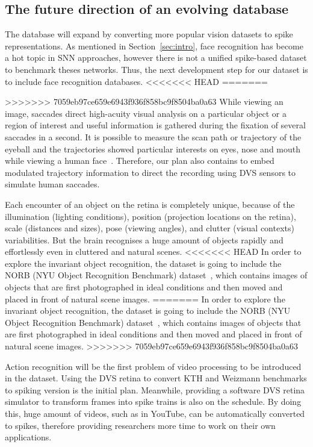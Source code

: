 \subsection{The future direction of an evolving database}
The database will expand by converting more popular vision datasets to spike representations.
As mentioned in Section~\ref{sec:intro}, face recognition has become a hot topic in SNN approaches, however there is not a unified spike-based dataset to benchmark theses networks.
Thus, the next development step for our dataset is to include face recognition databases.
<<<<<<< HEAD
=======

>>>>>>> 7059eb97ce659e6943f936f858bc9f8504ba0a63
While viewing an image,  saccades direct high-acuity visual analysis on a particular object or a region of interest and useful information is gathered during the fixation of several saccades in a second.
It is possible to measure the scan path or trajectory of the eyeball and the trajectories showed particular interests on eyes, nose and mouth while viewing a human face~\citep{yarbus1967eye}.
Therefore, our plan also contains to embed modulated trajectory information to direct the recording using DVS sensors to simulate human saccades.


Each encounter of an object on the retina is completely unique, because of the illumination (lighting conditions), position (projection locations on the retina), scale (distances and sizes), pose (viewing angles), and clutter (visual contexts) variabilities.
But the brain recognises a huge amount of objects rapidly and effortlessly even in cluttered and natural scenes.
<<<<<<< HEAD
In order to explore the invariant object recognition, the dataset is going to include the NORB (NYU Object Recognition Benchmark) dataset~\citep{lecun2004learning}, which contains images of objects that are first photographed in ideal conditions and then moved and placed in front of natural scene images.
=======
In order to explore the invariant object recognition, the dataset is going to include the NORB (NYU Object Recognition Benchmark) dataset~\citep{lecun2004learning}, which contains images of objects that are first photographed in ideal conditions and then moved and placed in front of natural scene images. 
>>>>>>> 7059eb97ce659e6943f936f858bc9f8504ba0a63

Action recognition will be the first problem of video processing to be introduced in the dataset.
Using the DVS retina to convert KTH and Weizmann benchmarks to spiking version is the initial plan.
Meanwhile, providing a software DVS retina simulator to transform  frames into spike trains is also on the schedule.
By doing this, huge amount of videos, such as in YouTube, can be automatically converted to spikes, therefore providing researchers more time to work on their own applications.


